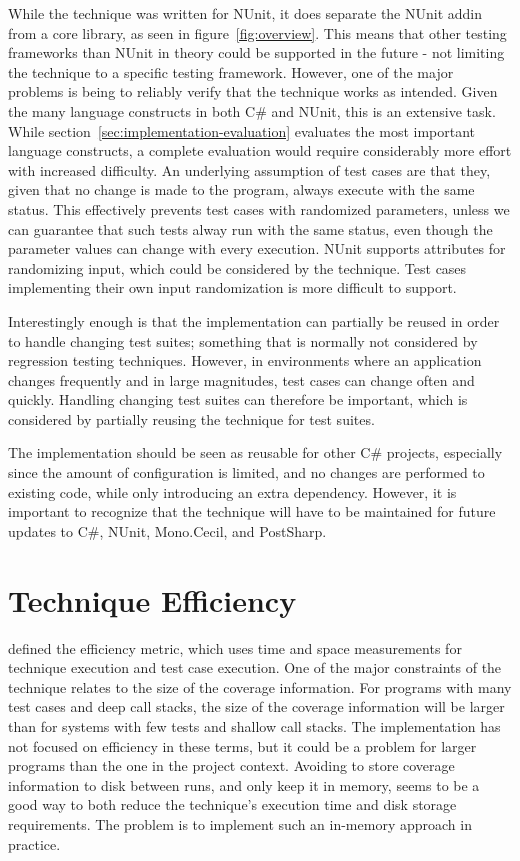 \documentclass[a4paper,english,12pt]{report}
\begin{document}
While the technique was written for NUnit, it does separate the NUnit addin from a core library, as seen in figure~\vref{fig:overview}. This means that other testing frameworks than NUnit in theory could be supported in the future - not limiting the technique to a specific testing framework. However, one of the major problems is being to reliably verify that the technique works as intended. Given the many language constructs in both C\# and NUnit, this is an extensive task. While section~\ref{sec:implementation-evaluation} evaluates the most important language constructs, a complete evaluation would require considerably more effort with increased difficulty. An underlying assumption of test cases are that they, given that no change is made to the program, always execute with the same status. This effectively prevents test cases with randomized parameters, unless we can guarantee that such tests alway run with the same status, even though the parameter values can change with every execution. NUnit supports attributes for randomizing input, which could be considered by the technique. Test cases implementing their own input randomization is more difficult to support.

Interestingly enough is that the implementation can partially be reused in order to handle changing test suites; something that is normally not considered by regression testing techniques. However, in environments where an application changes frequently and in large magnitudes, test cases can change often and quickly. Handling changing test suites can therefore be important, which is considered by partially reusing the technique for test suites.

The implementation should be seen as reusable for other C\# projects, especially since the amount of configuration is limited, and no changes are performed to existing code, while only introducing an extra dependency. However, it is important to recognize that the technique will have to be maintained for future updates to C\#, NUnit, Mono.Cecil, and PostSharp.

\section{Technique Efficiency}\label{sec:technique-efficiency}
\citet{rothermel1996analyzing} defined the efficiency metric, which uses time and space measurements for technique execution and test case execution. One of the major constraints of the technique relates to the size of the coverage information. For programs with many test cases and deep call stacks, the size of the coverage information will be larger than for systems with few tests and shallow call stacks. The implementation has not focused on efficiency in these terms, but it could be a problem for larger programs than the one in the project context. Avoiding to store coverage information to disk between runs, and only keep it in memory, seems to be a good way to both reduce the technique's execution time and disk storage requirements. The problem is to implement such an in-memory approach in practice.
\end{document}
